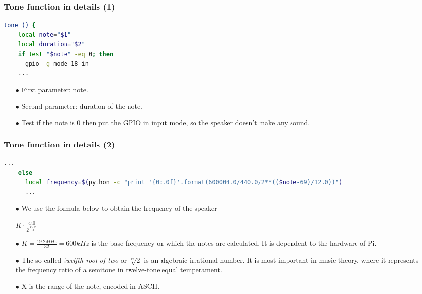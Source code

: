\documentclass{beamer}
\begin{document}

\begin{frame}[fragile]
	\frametitle{\textbf{Tone function in details (1)}}
  \begin{lstlisting}[language=bash]
  tone () {
    local note="$1"
    local duration="$2"
    if test "$note" -eq 0; then
      gpio -g mode 18 in
    ...
  \end{lstlisting}
  \begin{itemize}
  	\item[$\bullet$] First parameter: note.
  	\item[$\bullet$] Second parameter: duration of the note.
  	\item[$\bullet$] Test if the note is 0 then put the GPIO in input mode, so the speaker doesn’t make any sound. 
  \end{itemize}
\end{frame}


\begin{frame}[fragile]
	\frametitle{\textbf{Tone function in details (2)}}
  \begin{lstlisting}[language=bash]
    ...
    else
      local frequency=$(python -c "print '{0:.0f}'.format(600000.0/440.0/2**(($note-69)/12.0))")
      ...
  \end{lstlisting}
  \begin{itemize}
  	\item[$\bullet$] We use the formula below to obtain the frequency of the speaker
  	
  	\begin{center}
  			$K\cdot\frac{440}{2^{\frac{X-69}{12}}}$
  	\end{center}
  		
  	
  	\item[$\bullet$] $K =\frac{19.2MHz}{32} = 600kHz$ is the base frequency on which the notes are calculated. It is dependent to the hardware of Pi.
  	\item[$\bullet$] The so called \textit{twelfth root of two} or $\sqrt[12]{2}$ is an algebraic irrational number. It is most important in music theory, where it represents the frequency ratio of a semitone in twelve-tone equal temperament.
  	\item[$\bullet$] X is the range of the note, encoded in ASCII.
  \end{itemize}
\end{frame}

\end{document}
